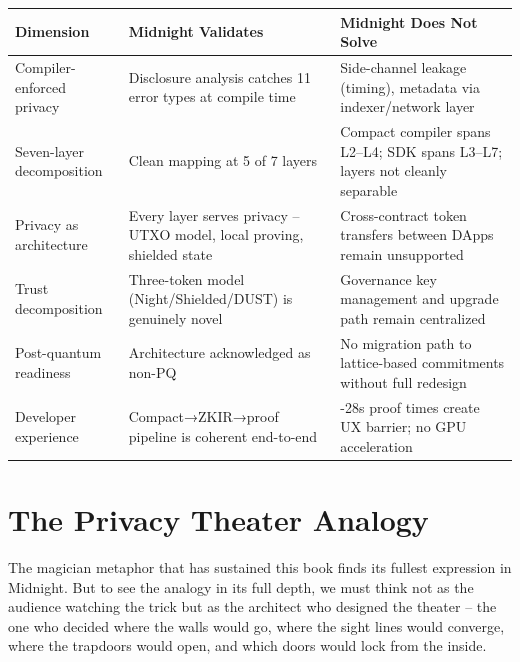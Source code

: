 \documentclass[
  11pt,
  openany]{report}
\begin{document}
\begin{longtable}[]{@{}
  >{\raggedright\arraybackslash}p{}
  >{\raggedright\arraybackslash}p{}
  >{\raggedright\arraybackslash}p{}@{}}
\toprule\noalign{}
\begin{minipage}[b]{\linewidth}\raggedright
Dimension
\end{minipage} & \begin{minipage}[b]{\linewidth}\raggedright
Midnight Validates
\end{minipage} & \begin{minipage}[b]{\linewidth}\raggedright
Midnight Does Not Solve
\end{minipage} \\
\midrule\noalign{}
\arrayrulecolor{MidnightBlue}\midrule\arrayrulecolor{MidnightBorder}
\endhead
\bottomrule\noalign{}
\endlastfoot
Compiler-enforced privacy & Disclosure analysis catches 11 error types at
compile time & Side-channel leakage (timing), metadata via indexer/network
layer \\
Seven-layer decomposition & Clean mapping at 5 of 7 layers & Compact compiler
spans L2--L4; SDK spans L3--L7; layers not cleanly separable \\
Privacy as architecture & Every layer serves privacy -- UTXO model, local
proving, shielded state & Cross-contract token transfers between DApps remain
unsupported \\
Trust decomposition & Three-token model (Night/Shielded/DUST) is genuinely novel
& Governance key management and upgrade path remain centralized \\
Post-quantum readiness & Architecture acknowledged as non-PQ & No migration path
to lattice-based commitments without full redesign \\
Developer experience & Compact→ZKIR→proof pipeline is coherent end-to-end &
17-28s proof times create UX barrier; no GPU acceleration \\
\end{longtable}

\section{The Privacy Theater Analogy}\label{the-privacy-theater-analogy}

The magician metaphor that has sustained this book finds its fullest expression
in Midnight. But to see the analogy in its full depth, we must think not as the
audience watching the trick but as the architect who designed the theater -- the
one who decided where the walls would go, where the sight lines would converge,
where the trapdoors would open, and which doors would lock from the inside.
\end{document}
